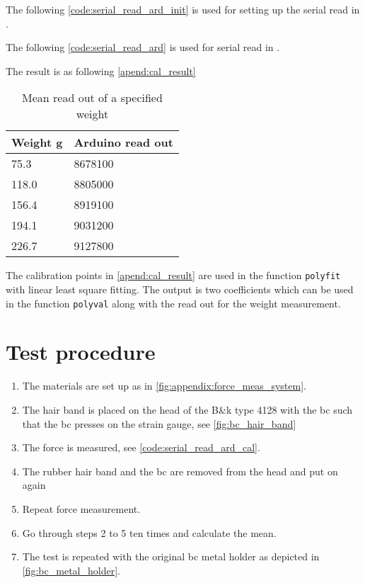 The following \autoref{code:serial_read_ard_init} is used for setting up the serial read in \matlab.


The following \autoref{code:serial_read_ard} is used for serial read in \matlab.


The result is as following \autoref{apend:cal_result}

\begin{table}[H]
\centering
\caption{Mean read out of a specified weight}
\label{apend:cal_result}
\begin{tabular}{l|l}
Weight \si{\gram} & Arduino read out \\ \hline
75.3              & 8678100          \\
118.0             & 8805000          \\
156.4             & 8919100          \\
194.1             & 9031200          \\
226.7             & 9127800         
\end{tabular}
\end{table}

The calibration points in \autoref{apend:cal_result} are used in the \matlab function \texttt{polyfit} with linear least square fitting. The output is two coefficients which can be used in the \matlab function \texttt{polyval} along with the read out for the weight measurement. 


\section*{Test procedure}


\begin{enumerate}
\item The materials are set up as in \autoref{fig:appendix:force_meas_system}.
\item The hair band is placed on the head of the B\&k type 4128 with the \gls{bc} such that the \gls{bc} presses on the strain gauge, see \autoref{fig:bc_hair_band}
\item The force is measured, see \autoref{code:serial_read_ard_cal}.
\item The rubber hair band and the \gls{bc} are removed from the head and put on again
\item Repeat force measurement.
\item  Go through steps 2 to 5 ten times and calculate the mean.
\item  The test is repeated with the original \gls{bc} metal holder as depicted in \autoref{fig:bc_metal_holder}.
\end{enumerate}



